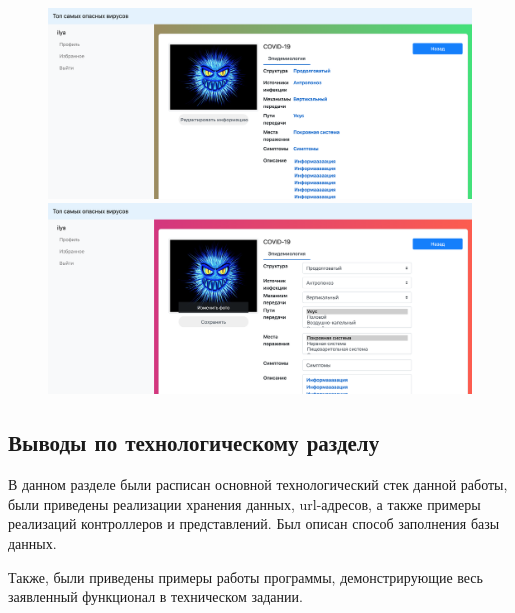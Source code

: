\documentclass[a4paper,14pt]{extarticle}
\begin{document}
 	
 	\begin{figure}[h!]
 		\begin{minipage}[b]{0.45\textwidth}
 			\includegraphics[width=\textwidth]{examples/more_virus_admin.png}
 		\end{minipage}
 		\begin{minipage}[b]{0.45\textwidth}
 			\includegraphics[width=\textwidth]{examples/edit_virus.png}
 		\end{minipage}
 		\label{ris:more_virus_admin_edit_virus}
 	\end{figure}
 	
 	\newpage
 	
 	\subsection*{Выводы по технологическому разделу}
 	
 	В данном разделе были расписан основной технологический стек данной работы, были приведены реализации хранения данных, url-адресов, а также примеры реализаций контроллеров и представлений. Был описан способ заполнения базы данных.
 	
 	Также, были приведены примеры работы программы, демонстрирующие весь заявленный функционал в техническом задании.
 	
\end{document}
